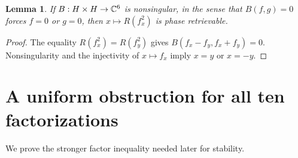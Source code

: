 \documentclass[11pt]{article}
\newtheorem{lemma}[theorem]{Lemma}
\theoremstyle{remark}\newtheorem{remark}[theorem]{Remark}
\begin{document}
\begin{lemma}\label{lem:bilinear}
If $B:H\times H\to\mathbb C^6$ is nonsingular, in the sense that $B(f,g)=0$ forces $f=0$ or $g=0$, then $x\mapsto R(f_x^2)$ is phase retrievable.
\end{lemma}
\begin{proof}
The equality $R(f_x^2)=R(f_y^2)$ gives
$B(f_x-f_y,f_x+f_y)=0$. Nonsingularity and the injectivity of $x\mapsto f_x$ imply $x=y$ or $x=-y$.
\end{proof}

\section{A uniform obstruction for all ten factorizations}
We prove the stronger factor inequality needed later for stability.
\end{document}
